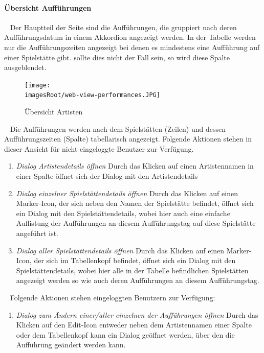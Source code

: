 \documentclass[11pt, a4paper, twoside]{article}   	%
\newcommand{\imagesRoot}{images}
\begin{document}
\paragraph{Übersicht Aufführungen}
\ \newline 
Der Hauptteil der Seite sind die Aufführungen, die gruppiert nach deren Aufführungsdatum in einem Akkordion angezeigt werden. In der Tabelle werden nur die Aufführungszeiten angezeigt bei denen es mindestens eine Aufführung auf einer Spielstätte gibt. sollte dies nicht der Fall sein, so wird diese Spalte ausgeblendet.
\begin{figure}[h]
	\centering
	\texttt{[image: \\imagesRoot/web-view-performances.JPG]}
	\caption
	{Übersicht Artisten}
\end{figure}
\ \newline
Die Aufführungen werden nach dem Spielstätten (Zeilen) und dessen Aufführungszeiten (Spalte) tabellarisch angezeigt. 
\newline
\newline
Folgende Aktionen stehen in dieser Ansicht für nicht eingeloggte Benutzer zur Verfügung.
\begin{enumerate}
	\item\emph{Dialog Artistendetails öffnen}
	\newline
	Durch das Klicken auf einen Artistennamen in einer Spalte öffnet sich der Dialog mit den Artistendetails
	\item\emph{Dialog einzelner Spielstättendetails öffnen}
	\newline
	Durch das Klicken auf einen Marker-Icon, der sich neben den Namen der Spielstätte befindet, öffnet sich ein Dialog mit den Spielstättendetails, wobei hier auch eine einfache Auflistung der Aufführungen an diesem Aufführungstag auf diese Spielstätte angeführt ist.
	\item\emph{Dialog aller Spielstättendetails öffnen}
	\newline
	Durch das Klicken auf einen Marker-Icon, der sich im Tabellenkopf befindet, öffnet sich ein Dialog mit den Spielstättendetails, wobei hier alle in der Tabelle befindlichen Spielstätten angezeigt werden so wie auch deren Aufführungen an diesem Aufführungstag.
\end{enumerate}
\ \newline
Folgende Aktionen stehen eingeloggten Benutzern zur Verfügung:
\begin{enumerate}
	\item\emph{Dialog zum Ändern einer/aller einzelnen der Aufführungen öffnen}
	\newline
	Durch das Klicken auf den Edit-Icon entweder neben dem Artistennamen einer Spalte oder dem Tabellenkopf kann ein Dialog geöffnet werden, über den die Aufführung geändert werden kann.
\end{enumerate}
\end{document}
